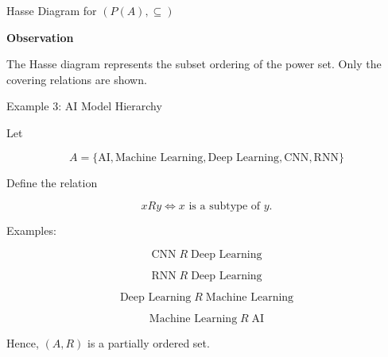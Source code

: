 \documentclass{beamer}
\begin{document}
\begin{frame}{Hasse Diagram for $(P(A),\subseteq)$}

\small

\centering


\vspace{0.3cm}

\textbf{Observation}

The Hasse diagram represents the subset ordering of the power set.
Only the covering relations are shown.

\end{frame}
\begin{frame}{Example 3: AI Model Hierarchy}

\small

Let

\[
A=\{\text{AI},\text{Machine Learning},
\text{Deep Learning},\text{CNN},\text{RNN}\}
\]

Define the relation

\[
xRy \iff x \text{ is a subtype of } y.
\]

Examples:

\[
\text{CNN}\;R\;\text{Deep Learning}
\]

\[
\text{RNN}\;R\;\text{Deep Learning}
\]

\[
\text{Deep Learning}\;R\;\text{Machine Learning}
\]

\[
\text{Machine Learning}\;R\;\text{AI}
\]

Hence, $(A,R)$ is a partially ordered set.

\end{frame}
\end{document}
